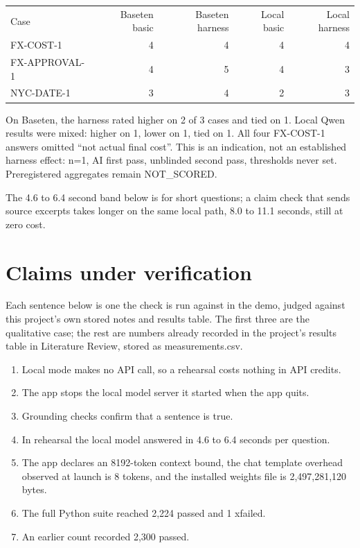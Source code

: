 \documentclass{article}
\begin{document}
\begin{center}
\begin{tabular}{lrrrr}
Case & Baseten basic & Baseten harness & Local basic & Local harness \\
FX-COST-1 & 4 & 4 & 4 & 4 \\
FX-APPROVAL-1 & 4 & 5 & 4 & 3 \\
NYC-DATE-1 & 3 & 4 & 2 & 3 \\
\end{tabular}
\end{center}

On Baseten, the harness rated higher on 2 of 3 cases and tied on 1.
Local Qwen results were mixed: higher on 1, lower on 1, tied on 1.
All four FX-COST-1 answers omitted ``not actual final cost''.
This is an indication, not an established harness effect: n=1, AI first pass,
unblinded second pass, thresholds never set. Preregistered aggregates remain NOT_SCORED.

The 4.6 to 6.4 second band below is for short questions; a claim check that sends source
excerpts takes longer on the same local path, 8.0 to 11.1 seconds, still at zero cost.

\section{Claims under verification}

Each sentence below is one the check is run against in the demo, judged against this
project's own stored notes and results table. The first three are the qualitative case; the rest are
numbers already recorded in the project's results table in Literature Review, stored as
measurements.csv.

\begin{enumerate}
  \item Local mode makes no API call, so a rehearsal costs nothing in API credits.
  \item The app stops the local model server it started when the app quits.
  \item Grounding checks confirm that a sentence is true.
  \item In rehearsal the local model answered in 4.6 to 6.4 seconds per question.
  \item The app declares an 8192-token context bound, the chat template overhead observed
        at launch is 8 tokens, and the installed weights file is 2,497,281,120 bytes.
  \item The full Python suite reached 2,224 passed and 1 xfailed.
  \item An earlier count recorded 2,300 passed.
\end{enumerate}
\end{document}
